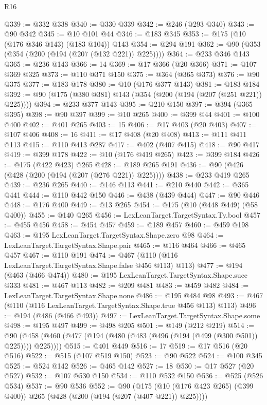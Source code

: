 \begin{lexlean}{R16}
\begin{coremodule}
@339 := @332 @338
@340 := @330 @339
@342 := @246 (@293 @340)
@343 := @90 @342
@345 := @10 @101 @44
@346 := @183 @345
@353 := @175 (@10 (@176 @346 @143) (@183 @104)) @143
@354 := @294 @191
@362 := @90 (@353 (@354 (@200 (@194 (@207 (@132 @221)) @225))))
@364 := @233 @346 @143
@365 := @236 @143
@366 := 14
@369 := @17 @366 (@20 @366)
@371 := @107 @369 @325
@373 := @110 @371 @150
@375 := @364 (@365 @373)
@376 := @90 @375
@377 := @183 @178
@380 := @10 (@176 @377 @143)
@381 := @183 @184
@392 := @90 (@175 (@380 @381) @143 (@354 (@200 (@194 (@207 (@251 @221)) @225))))
@394 := @233 @377 @143
@395 := @210 @150
@397 := @394 (@365 @395)
@398 := @90 @397
@399 := @10 @265
@400 := @399 @44
@401 := @100 @400
@402 := @401 @265
@403 := 15
@406 := @17 @403 (@20 @403)
@407 := @107 @406
@408 := 16
@411 := @17 @408 (@20 @408)
@413 := @111 @411 @113
@415 := @110 @413 @287
@417 := @402 (@407 @415)
@418 := @90 @417
@419 := @399 @178
@422 := @10 (@176 @419 @265)
@423 := @399 @184
@426 := @175 (@422 @423) @265
@428 := @189 @265 @191
@436 := @90 (@426 (@428 (@200 (@194 (@207 (@276 @221)) @225))))
@438 := @233 @419 @265
@439 := @236 @265
@440 := @146 @113
@441 := @210 @440
@442 := @365 @441
@444 := @110 @442 @150
@446 := @438 (@439 @444)
@447 := @90 @446
@448 := @176 @400
@449 := @13 @265
@454 := @175 (@10 (@448 @449) (@58 @400))
@455 := @140 @265
@456 := LexLeanTarget.TargetSyntax.Ty.bool
@457 := @455 @456
@458 := @454 @457
@459 := @189 @457
@460 := @459 @198
@463 := @195 LexLeanTarget.TargetSyntax.Shape.zero @98
@464 := LexLeanTarget.TargetSyntax.Shape.pair
@465 := @116 @464
@466 := @465 @457
@467 := @110 @191
@474 := @467 (@110 (@116 LexLeanTarget.TargetSyntax.Shape.false @456 @113) @113)
@477 := @194 (@463 (@466 @474))
@480 := @195 LexLeanTarget.TargetSyntax.Shape.succ @333
@481 := @467 @113
@482 := @209 @481
@483 := @459 @482
@484 := LexLeanTarget.TargetSyntax.Shape.none
@486 := @195 @484 @98
@493 := @467 (@110 (@116 LexLeanTarget.TargetSyntax.Shape.true @456 @113) @113)
@496 := @194 (@486 (@466 @493))
@497 := LexLeanTarget.TargetSyntax.Shape.some
@498 := @195 @497
@499 := @498 @205
@501 := @149 (@212 @219)
@514 := @90 (@458 (@460 (@477 (@194 (@480 (@483 (@496 (@194 (@499 (@300 @501)) @225)))) @225))))
@515 := @401 @449
@516 := 17
@519 := @17 @516 (@20 @516)
@522 := @515 (@107 @519 @150)
@523 := @90 @522
@524 := @100 @345
@525 := @524 @142
@526 := @465 @142
@527 := 18
@530 := @17 @527 (@20 @527)
@532 := @107 @530 @150
@534 := @110 @532 @150
@536 := @525 (@526 @534)
@537 := @90 @536
@552 := @90
    (@175 (@10 (@176 @423 @265) (@399 @400)) @265 (@428 (@200 (@194 (@207 (@407 @221)) @225))))

\end{coremodule}
\end{lexlean}
